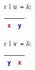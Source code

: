 \begin{tabular}{r l}
    \texttt{u =} & 
    \begin{tabular}{|p{1.5cm}|p{3cm}|}
    \hline
    \centering \texttt{\textcolor{red}{x}} & \centering\arraybackslash \texttt{\textcolor{blue}{y}} \\
    \hline
    \end{tabular}
\end{tabular}

\vspace{0.8cm}

\begin{tabular}{r l}
    \texttt{v =} & 
    \begin{tabular}{|p{3cm}|p{1.5cm}|}
    \hline
    \centering \texttt{\textcolor{blue}{y}} & \centering\arraybackslash \texttt{\textcolor{red}{x}} \\
    \hline
    \end{tabular}
\end{tabular}